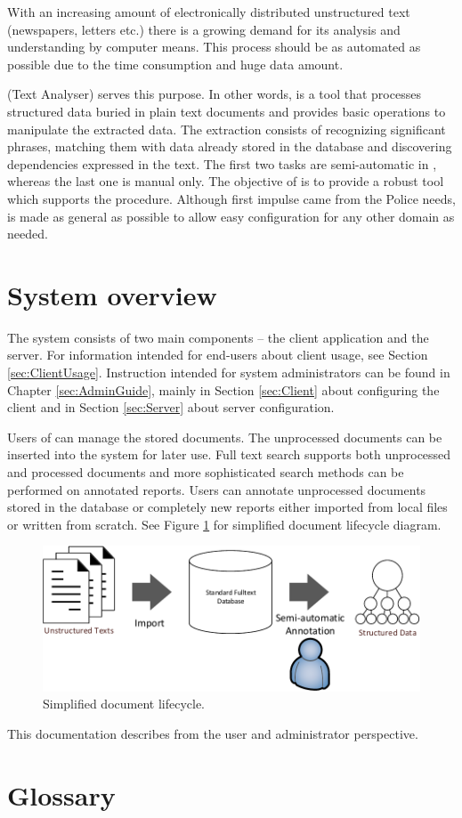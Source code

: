 
With an increasing amount of electronically distributed unstructured text
(newspapers, letters etc.) there is a growing demand for its analysis and
understanding by computer means. This process should be as automated as possible
due to the time consumption and huge data amount.

\textan{} (Text Analyser) serves this purpose. In other words, \textan{} is a
tool that processes structured data buried in plain text documents and provides
basic operations to manipulate the extracted data. The extraction consists of
recognizing significant phrases, matching them with data already stored in the
database and discovering dependencies expressed in the text. The first two tasks
are semi-automatic in \textan{}, whereas the last one is manual only. The
objective of \textan{} is to provide a robust tool which supports the procedure.
Although first impulse came from the Police needs, \textan{} is made as general as
possible to allow easy configuration for any other domain as needed.

\section{System overview}
The system consists of two main components -- the client application
and the server. For information intended for end-users about client usage, see
Section \ref{sec:ClientUsage}. Instruction intended for system
administrators can be found in Chapter \ref{sec:AdminGuide}, mainly in Section
\ref{sec:Client} about configuring the client and in Section \ref{sec:Server}
about server configuration.

Users of \textan{} can manage the stored documents. The unprocessed documents
can be inserted into the system for later use. Full text search supports both
unprocessed and processed documents and more sophisticated search methods can be
performed on annotated reports. Users can annotate unprocessed documents stored
in the database or completely new reports either imported from local files or
written from scratch. See Figure \ref{fig:Overview} for simplified document
lifecycle diagram.

\begin{figure}[!htb]
        \centering
        \includegraphics[width=\textwidth]{Images/Overview}
        \caption{Simplified document lifecycle.}
        \label{fig:Overview}
\end{figure}

This documentation describes \textan{} from the user and administrator
perspective.

\section{Glossary}


